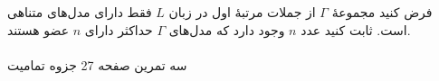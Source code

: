 فرض کنید مجموعهٔ
$\Gamma$
از جملات مرتبهٔ اول در زبان 
$L$
فقط دارای مدل‌های متناهی است. ثابت کنید عدد 
$n$
وجود دارد که مدل‌های 
$\Gamma$
حداکثر دارای 
$n$
عضو هستند. 
\\
\\
سه تمرین صفحه 27 جزوه تمامیت
